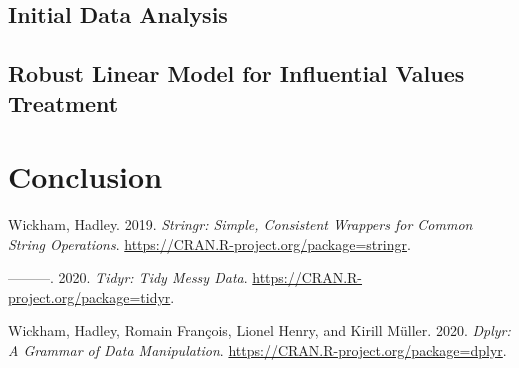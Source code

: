 \documentclass{article}
\begin{document}
\hypertarget{initial-data-analysis}{%
\subsection{Initial Data Analysis}\label{initial-data-analysis}}

\hypertarget{robust-linear-model-for-influential-values-treatment}{%
\subsection{Robust Linear Model for Influential Values
Treatment}\label{robust-linear-model-for-influential-values-treatment}}

\hypertarget{conclusion}{%
\section*{Conclusion}\label{conclusion}}

\hypertarget{refs}{}
\leavevmode\hypertarget{ref-stringr}{}%
Wickham, Hadley. 2019. \emph{Stringr: Simple, Consistent Wrappers for
Common String Operations}.
\url{https://CRAN.R-project.org/package=stringr}.

\leavevmode\hypertarget{ref-tidyr}{}%
---------. 2020. \emph{Tidyr: Tidy Messy Data}.
\url{https://CRAN.R-project.org/package=tidyr}.

\leavevmode\hypertarget{ref-dplyr}{}%
Wickham, Hadley, Romain François, Lionel Henry, and Kirill Müller. 2020.
\emph{Dplyr: A Grammar of Data Manipulation}.
\url{https://CRAN.R-project.org/package=dplyr}.



\end{document}
